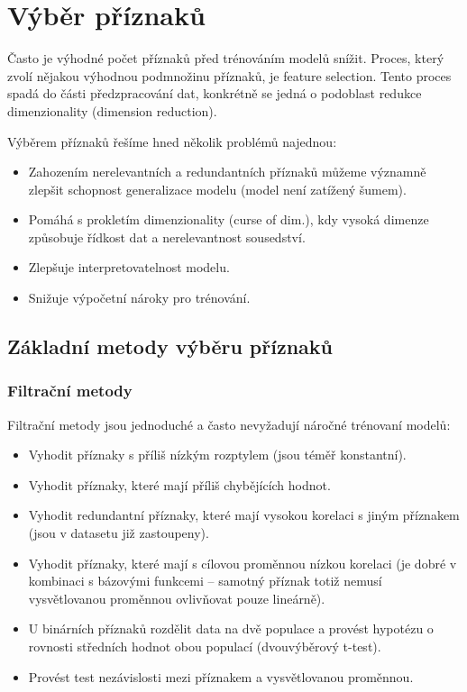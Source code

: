 \documentclass[../main.tex]{subfiles}
\begin{document}
\section{Výběr příznaků}

Často je výhodné počet příznaků před trénováním modelů snížit. Proces, který zvolí nějakou výhodnou podmnožinu příznaků, je feature selection. Tento proces spadá do části předzpracování dat, konkrétně se jedná o podoblast redukce dimenzionality (dimension reduction).

Výběrem příznaků řešíme hned několik problémů najednou:
\begin{itemize}
    \item Zahozením nerelevantních a redundantních příznaků můžeme významně zlepšit schopnost generalizace modelu (model není zatížený šumem).
    \item Pomáhá s prokletím dimenzionality (curse of dim.), kdy vysoká dimenze způsobuje řídkost dat a nerelevantnost sousedství.
    \item Zlepšuje interpretovatelnost modelu.
    \item Snižuje výpočetní nároky pro trénování.
\end{itemize}

\subsection{Základní metody výběru příznaků}

\subsubsection{Filtrační metody}

Filtrační metody jsou jednoduché a často nevyžadují náročné trénovaní modelů:
\begin{itemize}

    \item Vyhodit příznaky s příliš nízkým rozptylem (jsou téměř konstantní).

    \item Vyhodit příznaky, které mají příliš chybějících hodnot.

    \item Vyhodit redundantní příznaky, které mají vysokou korelaci s jiným příznakem (jsou v datasetu již zastoupeny).

    \item Vyhodit příznaky, které mají s cílovou proměnnou nízkou korelaci (je dobré v kombinaci s bázovými funkcemi -- samotný příznak totiž nemusí vysvětlovanou proměnnou ovlivňovat pouze lineárně).

    \item U binárních příznaků rozdělit data na dvě populace a provést hypotézu o rovnosti středních hodnot obou populací (dvouvýběrový t-test).

    \item Provést test nezávislosti mezi příznakem a vysvětlovanou proměnnou.

\end{itemize}
\end{document}
